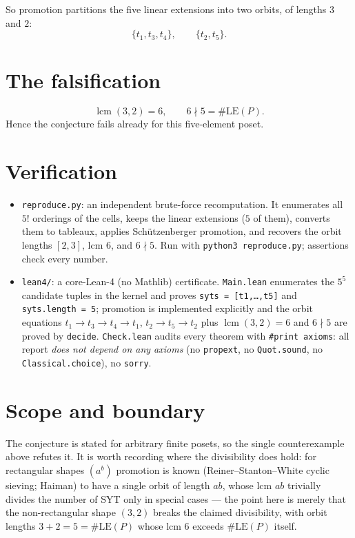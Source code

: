 \documentclass[11pt]{article}
\begin{document}
So promotion partitions the five linear extensions into two orbits, of lengths
$3$ and $2$:
\[
\{t_1, t_3, t_4\}, \qquad \{t_2, t_5\}.
\]

\section{The falsification}

\[
\operatorname{lcm}(3,2) = 6, \qquad 6 \nmid 5 = \#\mathrm{LE}(P).
\]
Hence the conjecture fails already for this five-element poset.

\section{Verification}

\begin{itemize}
  \item \texttt{reproduce.py}: an independent brute-force recomputation.  It
  enumerates all $5!$ orderings of the cells, keeps the linear extensions
  ($5$ of them), converts them to tableaux, applies Sch\"utzenberger promotion,
  and recovers the orbit lengths $[2,3]$, lcm $6$, and $6 \nmid 5$.
  Run with \texttt{python3 reproduce.py}; assertions check every number.
  \item \texttt{lean4/}: a core-Lean-4 (no Mathlib) certificate.  \texttt{Main.lean}
  enumerates the $5^5$ candidate tuples in the kernel and proves
  \texttt{syts = [t1,\dots,t5]} and \texttt{syts.length = 5}; promotion is
  implemented explicitly and the orbit equations
  $t_1 \to t_3 \to t_4 \to t_1$, $t_2 \to t_5 \to t_2$ plus
  $\operatorname{lcm}(3,2)=6$ and $6 \nmid 5$ are proved by \texttt{decide}.
  \texttt{Check.lean} audits every theorem with \texttt{\#print axioms}: all
  report \emph{does not depend on any axioms} (no \texttt{propext}, no
  \texttt{Quot.sound}, no \texttt{Classical.choice}), no \texttt{sorry}.
\end{itemize}

\section{Scope and boundary}

The conjecture is stated for arbitrary finite posets, so the single counterexample
above refutes it.  It is worth recording where the divisibility does hold: for
rectangular shapes $(a^b)$ promotion is known (Reiner--Stanton--White cyclic
sieving; Haiman) to have a single orbit of length $ab$, whose lcm $ab$ trivially
divides the number of SYT only in special cases --- the point here is merely that
the non-rectangular shape $(3,2)$ breaks the claimed divisibility, with orbit
lengths $3+2=5=\#\mathrm{LE}(P)$ whose lcm $6$ exceeds $\#\mathrm{LE}(P)$ itself.
\end{document}
